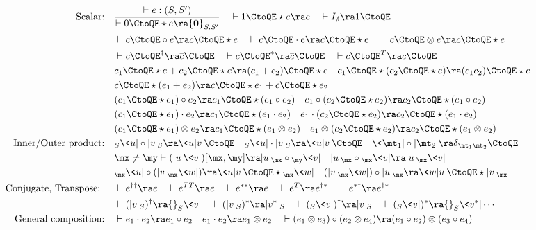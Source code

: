 \begin{align*}
	\text{Scalar:}\quad
	&\frac{\vdash e : (S,S^\prime)}{\vdash 0\CtoQE \star e \ra {\bf 0}_{S,S^\prime}} \quad \vdash 1\CtoQE \star e \ra e \quad 
	\vdash I_{\emptyset} \ra 1\CtoQE
	\\ 
	&\vdash c\CtoQE \circ e \ra c\CtoQE \star e \quad \vdash c\CtoQE \cdot e \ra c\CtoQE \star e \quad \vdash c\CtoQE \otimes e \ra c\CtoQE \star e\\
	&\vdash c\CtoQE^\dag \ra \overline{c}\CtoQE \quad
	\vdash c\CtoQE^\ast \ra \overline{c}\CtoQE \quad
	\vdash c\CtoQE^T \ra c\CtoQE \\
	&c_1\CtoQE \star e + c_2\CtoQE \star e \ra (c_1+c_2)\CtoQE \star e \quad
	c_1\CtoQE \star (c_2\CtoQE \star e) \ra (c_1c_2)\CtoQE \star e\\
	&c\CtoQE \star (e_1 + e_2) \ra c\CtoQE \star e_1 + c\CtoQE \star e_2\\
	&(c_1\CtoQE \star e_1)\circ e_2 \ra c_1\CtoQE \star(e_1\circ e_2)\quad 
	e_1\circ (c_2\CtoQE \star e_2)\ra c_2\CtoQE \star(e_1\circ e_2)\\ 
	&(c_1\CtoQE \star e_1)\cdot e_2 \ra c_1\CtoQE \star(e_1\cdot e_2)\quad 
	e_1\cdot (c_2\CtoQE \star e_2)\ra c_2\CtoQE \star(e_1\cdot e_2)\\ 
	&(c_1\CtoQE \star e_1)\otimes e_2 \ra c_1\CtoQE \star(e_1\otimes e_2)\quad 
	e_1\otimes (c_2\CtoQE \star e_2)\ra c_2\CtoQE \star(e_1\otimes e_2)\\
	\text{Inner/Outer product:}\quad
	&{}_S\<u|\circ |v\>_S \ra \<u|v\>\CtoQE \quad 
	{}_S\<u|\cdot |v\>_S \ra \<u|v\>\CtoQE \quad
	\<\mt_1|\circ |\mt_2\> \ra \delta_{\mt_1\mt_2}\CtoQE\\
	&\mx \neq \my\vdash(|u\>\<v|)[\mx,\my]\ra |u\>_\mx\circ{}_\my\<v| \quad 
	|u\>_\mx\circ{}_\mx\<v|\ra |u\>_\mx\<v| \\
	&{}_\mx\<u|\circ (|v\>_\mx\<w|) \ra \<u|v\>\CtoQE \star{}_\mx\<w|\quad
	(|v\>_\mx\<w|) \circ |u\>_\mx \ra \<w|u\>\CtoQE \star|v\>_\mx\quad
	\\
	\text{Conjugate, Transpose: }\quad
	&\vdash e^{\dag\dag} \ra e \quad \vdash e^{TT} \ra e \quad 
	\vdash e^{\ast\ast} \ra e \quad \vdash e^{T} \ra e^{\dag\ast} 
	\quad \vdash e^{\ast\dag} \ra e^{\dag\ast} \\
	&\vdash (|v\>_S)^\dag \ra {}_S\<v| \quad
	\vdash (|v\>_S)^\ast \ra |v^\ast\>_S \quad
	\vdash ({}_S\<v|)^\dag \ra |v\>_S \quad 
	\vdash ({}_S\<v|)^\ast \ra {}_S\<v^\ast| \cdots\\
	\text{General composition:}\quad
	&\vdash e_1\cdot e_2 \ra e_1\circ e_2\quad e_1\cdot e_2 \ra e_1\otimes e_2\quad
	\vdash (e_1\otimes e_3)\circ(e_2\otimes e_4) \ra (e_1\circ e_2)\otimes (e_3\circ e_4)\\

\end{align*}
